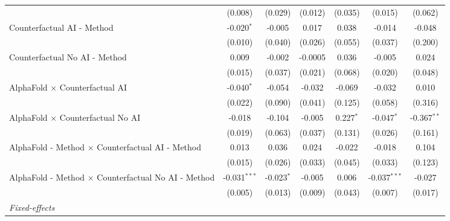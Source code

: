 \begin{tabular}{lcccccc}
                                                              & (0.008)        & (0.029)      & (0.012)       & (0.035)     & (0.015)        & (0.062)\\   
   Counterfactual AI - Method                                 & -0.020$^{*}$   & -0.005       & 0.017         & 0.038       & -0.014         & -0.048\\   
                                                              & (0.010)        & (0.040)      & (0.026)       & (0.055)     & (0.037)        & (0.200)\\   
   Counterfactual No AI - Method                              & 0.009          & -0.002       & -0.0005       & 0.036       & -0.005         & 0.024\\   
                                                              & (0.015)        & (0.037)      & (0.021)       & (0.068)     & (0.020)        & (0.048)\\   
   AlphaFold $\times$ Counterfactual AI                       & -0.040$^{*}$   & -0.054       & -0.032        & -0.069      & -0.032         & 0.010\\   
                                                              & (0.022)        & (0.090)      & (0.041)       & (0.125)     & (0.058)        & (0.316)\\   
   AlphaFold $\times$ Counterfactual No AI                    & -0.018         & -0.104       & -0.005        & 0.227$^{*}$ & -0.047$^{*}$   & -0.367$^{**}$\\   
                                                              & (0.019)        & (0.063)      & (0.037)       & (0.131)     & (0.026)        & (0.161)\\   
   AlphaFold - Method $\times$ Counterfactual AI - Method     & 0.013          & 0.036        & 0.024         & -0.022      & -0.018         & 0.104\\   
                                                              & (0.015)        & (0.026)      & (0.033)       & (0.045)     & (0.033)        & (0.123)\\   
   AlphaFold - Method $\times$ Counterfactual No AI - Method  & -0.031$^{***}$ & -0.023$^{*}$ & -0.005        & 0.006       & -0.037$^{***}$ & -0.027\\   
                                                              & (0.005)        & (0.013)      & (0.009)       & (0.043)     & (0.007)        & (0.017)\\   
   \midrule
   \emph{Fixed-effects}\\

\end{tabular}
